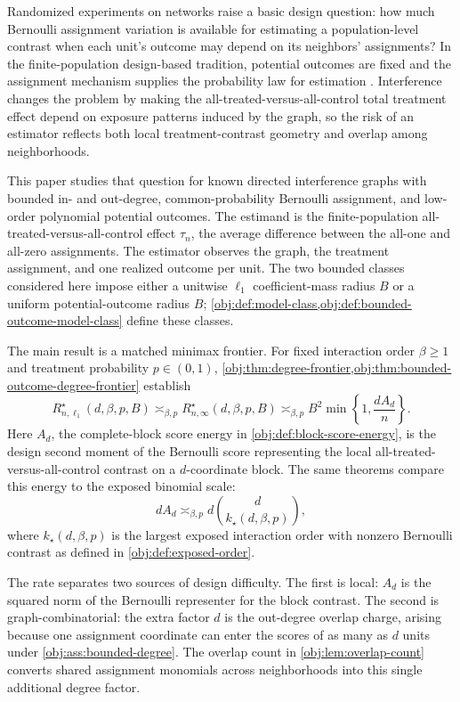 Randomized experiments on networks raise a basic design question: how much Bernoulli assignment variation is available for estimating a population-level contrast when each unit's outcome may depend on its neighbors' assignments? In the finite-population design-based tradition, potential outcomes are fixed and the assignment mechanism supplies the probability law for estimation \citep{HorvitzThompson1952,Rubin1978,ImbensRubin2015}. Interference changes the problem by making the all-treated-versus-all-control total treatment effect depend on exposure patterns induced by the graph, so the risk of an estimator reflects both local treatment-contrast geometry and overlap among neighborhoods.

This paper studies that question for known directed interference graphs with bounded in- and out-degree, common-probability Bernoulli assignment, and low-order polynomial potential outcomes. The estimand is the finite-population all-treated-versus-all-control effect \(\tau_n\), the average difference between the all-one and all-zero assignments. The estimator observes the graph, the treatment assignment, and one realized outcome per unit. The two bounded classes considered here impose either a unitwise \(\ell_1\) coefficient-mass radius \(B\) or a uniform potential-outcome radius \(B\); \cref{obj:def:model-class,obj:def:bounded-outcome-model-class} define these classes.

The main result is a matched minimax frontier. For fixed interaction order \(\beta\ge1\) and treatment probability \(p\in(0,1)\), \cref{obj:thm:degree-frontier,obj:thm:bounded-outcome-degree-frontier} establish
\[
R_{n,\ell_1}^{\star}(d,\beta,p,B)
\asymp_{\beta,p}
R_{n,\infty}^{\star}(d,\beta,p,B)
\asymp_{\beta,p}
B^2\min\!\left\{1,\frac{dA_d}{n}\right\}.
\]
Here \(A_d\), the complete-block score energy in \cref{obj:def:block-score-energy}, is the design second moment of the Bernoulli score representing the local all-treated-versus-all-control contrast on a \(d\)-coordinate block. The same theorems compare this energy to the exposed binomial scale:
\[
dA_d\asymp_{\beta,p}d\binom d{k_\star(d,\beta,p)},
\]
where \(k_\star(d,\beta,p)\) is the largest exposed interaction order with nonzero Bernoulli contrast as defined in \cref{obj:def:exposed-order}.

The rate separates two sources of design difficulty. The first is local: \(A_d\) is the squared norm of the Bernoulli representer for the block contrast. The second is graph-combinatorial: the extra factor \(d\) is the out-degree overlap charge, arising because one assignment coordinate can enter the scores of as many as \(d\) units under \cref{obj:ass:bounded-degree}. The overlap count in \cref{obj:lem:overlap-count} converts shared assignment monomials across neighborhoods into this single additional degree factor.


